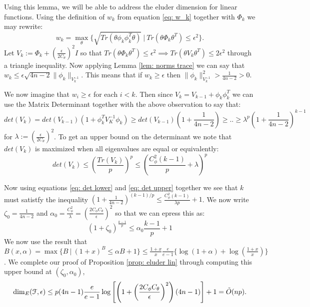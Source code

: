 \documentclass{article}
\newcommand{\Fc}{\mathcal{F}}
\begin{document}
Using this lemma, we will be able to address the eluder dimension for linear functions.
Using the definition of $w_k$ from equation \ref{eq: w_k} together with $\Phi_k$ we may rewrite:
$$ w_k = \max_\theta \{ \sqrt{Tr(\theta \phi_k \phi_k^T \theta)} \ \big| \ Tr(\theta \Phi_k \theta^T) \le \epsilon^2\}.$$
Let $V_k := \Phi_k + \left(\frac{\epsilon}{2C_\theta}\right)^2 I $ so that $Tr(\theta \Phi_k \theta^T) \le \epsilon^2 \implies Tr(\theta V_k \theta^T) \le 2\epsilon^2$ through a triangle inequality.
Now applying Lemma \ref{lem: norms trace} we can say that $w_k \le \epsilon \sqrt{4n-2} \|\phi_k\|_{V_k^{-1}}$.
This means that if $w_k \ge \epsilon$ then $\|\phi_k\|_{V_k^{-1}}^2 > \frac{1}{4n-2} >0$.

We now imagine that $w_i \ge \epsilon$ for each $i<k$.
Then since $V_k = V_{k-1} + \phi_k \phi_k^T$ we can use the Matrix Determinant together with the above observation to say that:
\begin{equation}
\label{eq: det lower}
	det(V_k) = det(V_{k-1})(1+ \phi_k^T V_K^{-1} \phi_k) \ge det(V_{k-1})\left(1 + \frac{1}{4n-2}\right) \ge ..
		\ge \lambda^{p} \left( 1 + \frac{1}{4n-2} \right)^{k-1}
\end{equation}
for $\lambda := \left(\frac{\epsilon}{2C_\theta}\right)^2$.
To get an upper bound on the determinant we note that $det(V_k)$ is maximized when all eigenvalues are equal or equivalently:
\begin{equation}
\label{eq: det upper}
det(V_k) \le \left( \frac{Tr(V_k)}{p}\right)^p \le \left(\frac{C_\phi^2(k-1)}{p} + \lambda \right)^p
\end{equation}

Now using equations \ref{eq: det lower} and \ref{eq: det upper} together we see that $k$ must satistfy the inequality
$ \left( 1 + \frac{1}{4n-2} \right)^{(k-1)/p} \le \frac{C_\phi^2(k-1)}{\lambda  p} + 1$.
We now write $\zeta_0 = \frac{1}{4n-2}$ and $\alpha_0 = \frac{C_\phi^2}{\lambda} = \left( \frac{2C_\phi C_\theta}{\epsilon}\right)^2$ so that we can epress this as:
$$ (1 + \zeta_0)^{\frac{k-1}{p}} \le \alpha_0 \frac{k-1}{p} +1 $$
We now use the result that $B(x,\alpha) = \max\{B  \ \big| \ (1+x)^B \le \alpha B+1\} \le \frac{1+x}{x}\frac{e}{e-1} \{\log(1+\alpha)+\log(\frac{1+x}{x})\}$.
We complete our proof of Proposition \ref{prop: eluder lin} through computing this upper bound at $(\zeta_0, \alpha_0)$,
$$ {\rm dim}_E(\Fc, \epsilon) \le p(4n-1)\frac{e}{e-1} \log\left[ \left(1+\left( \frac{2C_\phi C_\theta}{\epsilon}\right)^2 \right)\left(4n-1\right) \right] + 1 = \tilde{O}(np). $$
\end{document}

